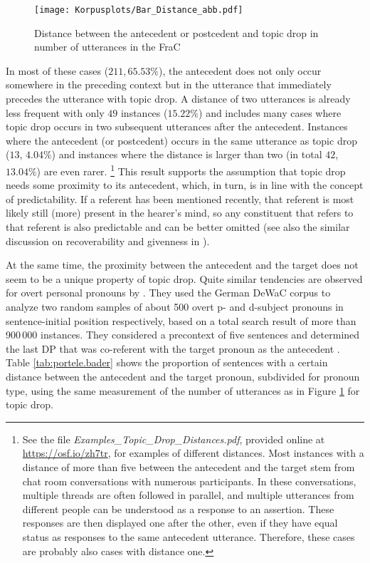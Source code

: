 \begin{figure}
\centering
\texttt{[image: Korpusplots/Bar\_Distance\_abb.pdf]}
\caption[Distance between the antecedent (or postcedent) and topic drop in the FraC]{Distance between the antecedent or postcedent and topic drop in number of utterances in the FraC}
\label{fig:FraC.distance}
\end{figure}

In most of these cases ($211, 65.53\%$), the antecedent does not only occur somewhere in the preceding context but in the utterance that immediately precedes the utterance with topic drop.
A distance of two utterances is already less frequent with only $49$ instances ($15.22\%$) and includes many cases where topic drop occurs in two subsequent utterances after the antecedent.
Instances where the antecedent (or postcedent) occurs in the same utterance as topic drop ($13$, $4.04\%$) and instances where the distance is larger than two (in total $42$, $13.04\%$) are even rarer.%
\footnote{See the file \textit{Examples\_Topic\_Drop\_Distances.pdf}, provided online at \url{https://osf.io/zh7tr}, for examples of different distances.
Most instances with a distance of more than five between the antecedent and the target stem from chat room conversations with numerous participants. 
In these conversations, multiple threads are often followed in parallel, and multiple utterances from different people can be understood as a response to an assertion.
These responses are then displayed one after the other, even if they have equal status as responses to the same antecedent utterance.
Therefore, these cases are probably also cases with distance one.}
%
This result supports the assumption that topic drop needs some proximity to its antecedent, which, in turn, is in line with the concept of predictability. 
If a referent has been mentioned recently, that referent is most likely still (more) present in the hearer's mind, so any constituent that refers to that referent is also predictable  and can be better omitted (see also the similar discussion on recoverability and givenness in ).

At the same time, the proximity between the antecedent and the target does not seem to be a unique property of topic drop.
Quite similar tendencies are observed for overt personal pronouns by \citet{portele.bader2016}.
They used the German DeWaC corpus  \citep{baroni.etal2009} to analyze two random samples of about 500 overt p- and d-subject pronouns in sentence-initial position respectively, based on a total search result of more than 900\,000 instances.
They considered a precontext of five sentences and determined the last DP that was co-referent with the target pronoun as the antecedent \citep[11--13]{portele.bader2016}.
Table \ref{tab:portele.bader} shows the proportion of sentences with a certain distance between the antecedent and the target pronoun, subdivided for pronoun type, using the same measurement of the number of utterances as in Figure \ref{fig:FraC.distance} for topic drop.

